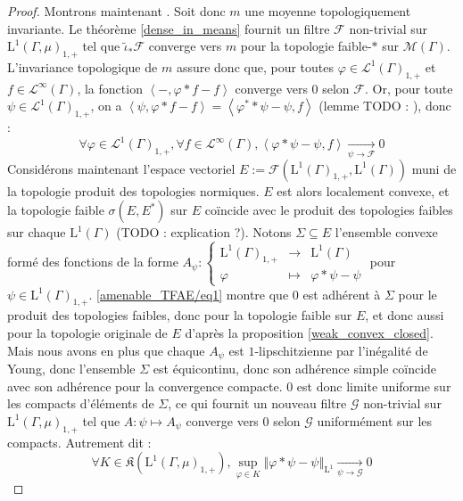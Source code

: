 \documentclass[a4paper,12pt]{article}
\newcommand{\norm}[1]{\left\Vert #1\right\Vert}
\newcommand{\ket}[1]{\left\langle #1 \right\rangle}
\newcommand\fundef[3]{#1: \left\{\begin{array}{ccc}#2\\#3\end{array}\right.}
\renewcommand{\implies}{\Rightarrow}
\newcommand{\blank}{{-}}
\newcommand{\TODO}[1]{{\color{red}TODO :} #1}
\begin{document}
\begin{proof}
    Montrons maintenant \framebox{$(\ref{amenable_TFAE/topological_mean})\implies(\ref{amenable_TFAE/strong_Reiter})$}. Soit donc $m$ une moyenne topologiquement invariante.
    Le théorème \ref{dense_in_means} fournit un filtre $\mathscr{F}$ non-trivial sur $\mathrm{L}^1(\Gamma, \mu)_{1, +}$
    tel que $\widetilde{\iota}_*\mathscr{F}$ converge vers $m$ pour la topologie faible-$*$ sur $\mathcal{M}(\Gamma)$.
    L'invariance topologique de $m$ assure donc que, pour toutes $\varphi\in\mathscr{L}^1(\Gamma)_{1, +}$ et 
    $f\in\mathscr{L}^\infty(\Gamma)$, la fonction $\ket{\blank, \varphi\ast f - f}$ converge vers $0$ selon $\mathscr{F}$.
    Or, pour toute $\psi\in\mathscr{L}^1(\Gamma)_{1, +}$, on a $\ket{\psi, \varphi\ast f - f} = \ket{\varphi^*\ast\psi - \psi, f}$ (lemme \TODO{}),
    donc :
    \begin{equation}\label{amenable_TFAE/eq1}
        \forall\varphi\in\mathscr{L}^1(\Gamma)_{1, +}, \forall f\in\mathscr{L}^\infty(\Gamma), \ket{\varphi\ast\psi - \psi, f}\xrightarrow[\psi\to\mathscr{F}]{}0
    \end{equation}
    Considérons maintenant l'espace vectoriel $E := \mathcal{F}(\mathrm{L}^1(\Gamma)_{1, +}, \mathrm{L}^1(\Gamma))$ muni de la topologie 
    produit des topologies normiques. $E$ est alors localement convexe, et la topologie faible $\sigma(E, E^*)$ sur $E$
    coïncide avec le produit des topologies faibles sur chaque $\mathrm{L}^1(\Gamma)$ (\TODO{explication ?}). Notons $\Sigma\subseteq E$ l'ensemble convexe formé
    des fonctions de la forme $\fundef{A_\psi}{\mathrm{L}^1(\Gamma)_{1, +}&\to&\mathrm{L}^1(\Gamma)}{\varphi&\mapsto&\varphi\ast\psi - \psi}$ pour $\psi\in\mathrm{L}^1(\Gamma)_{1, +}$.
    \eqref{amenable_TFAE/eq1} montre que $0$ est adhérent à $\Sigma$ pour le produit des topologies faibles, 
    donc pour la topologie faible sur $E$, et donc aussi pour la topologie originale de $E$ d'après la proposition \ref{weak_convex_closed}.
    Mais nous avons en plus que chaque $A_\psi$ est $1$-lipschitzienne par l'inégalité de Young, donc l'ensemble
    $\Sigma$ est équicontinu, donc son adhérence simple coïncide avec son adhérence pour la convergence compacte.
    $0$ est donc limite uniforme sur les compacts d'éléments de $\Sigma$, ce qui fournit un nouveau filtre $\mathscr{G}$ non-trivial sur $\mathrm{L}^1(\Gamma, \mu)_{1, +}$ 
    tel que $A:\psi\mapsto A_\psi$ converge vers $0$ selon $\mathscr{G}$ uniformément sur les compacts. Autrement dit :
    \begin{equation}\label{amenable_TFAE/eq2}
        \forall K\in\mathfrak{K}(\mathrm{L}^1(\Gamma, \mu)_{1, +}), \sup_{\varphi\in K}\norm{\varphi\ast\psi - \psi}_{\mathrm{L}^1} \xrightarrow[\psi\to\mathscr{G}]{} 0
    \end{equation}


\end{proof}
\end{document}
